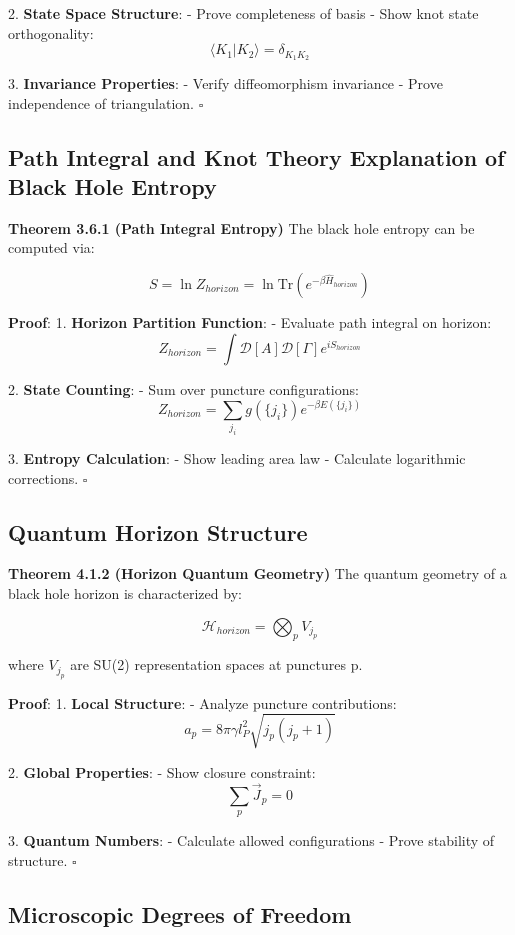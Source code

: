 \documentclass[12pt,a4paper]{article}
\begin{document}
2. \textbf{State Space Structure}:
   - Prove completeness of basis
   - Show knot state orthogonality:
     \[
     \langle K_1|K_2\rangle = \delta_{K_1K_2}
     \]

3. \textbf{Invariance Properties}:
   - Verify diffeomorphism invariance
   - Prove independence of triangulation. $\square$

\subsection{Path Integral and Knot Theory Explanation of Black Hole Entropy}

\textbf{Theorem 3.6.1 (Path Integral Entropy)}
The black hole entropy can be computed via:

\[
S = \ln Z_{horizon} = \ln \text{Tr}(e^{-\beta\hat{H}_{horizon}})
\]

\textbf{Proof}:
1. \textbf{Horizon Partition Function}:
   - Evaluate path integral on horizon:
     \[
     Z_{horizon} = \int \mathcal{D}[A]\mathcal{D}[\Gamma] e^{iS_{horizon}}
     \]
   
2. \textbf{State Counting}:
   - Sum over puncture configurations:
     \[
     Z_{horizon} = \sum_{j_i} g(\{j_i\})e^{-\beta E(\{j_i\})}
     \]

3. \textbf{Entropy Calculation}:
   - Show leading area law
   - Calculate logarithmic corrections. $\square$

\subsection{Quantum Horizon Structure}

\textbf{Theorem 4.1.2 (Horizon Quantum Geometry)}
The quantum geometry of a black hole horizon is characterized by:

\[
\mathcal{H}_{horizon} = \bigotimes_{p} V_{j_p}
\]

where $V_{j_p}$ are SU(2) representation spaces at punctures p.

\textbf{Proof}:
1. \textbf{Local Structure}:
   - Analyze puncture contributions:
     \[
     a_p = 8\pi\gamma l_P^2\sqrt{j_p(j_p+1)}
     \]

2. \textbf{Global Properties}:
   - Show closure constraint:
     \[
     \sum_p \vec{J}_p = 0
     \]

3. \textbf{Quantum Numbers}:
   - Calculate allowed configurations
   - Prove stability of structure. $\square$

\subsection{Microscopic Degrees of Freedom}
\end{document}
